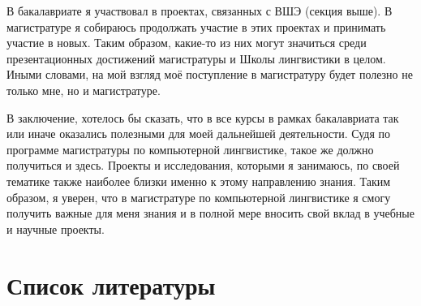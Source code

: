 \documentclass[a4paper,10pt]{article}
\begin{document}
В бакалавриате я участвовал в проектах, связанных с ВШЭ (секция выше). В магистратуре я собираюсь продолжать участие в этих проектах и принимать участие в новых. Таким образом, какие-то из них могут значиться среди презентационных достижений магистратуры и Школы лингвистики в целом. Иными словами, на мой взгляд моё поступление в магистратуру будет полезно не только мне, но и магистратуре.

В заключение, хотелось бы сказать, что в все курсы в рамках бакалавриата так или иначе оказались полезными для моей дальнейшей деятельности. Судя по программе магистратуры по компьютерной лингвистике, такое же должно получиться и здесь. Проекты и исследования, которыми я занимаюсь, по своей тематике также наиболее близки именно к этому направлению знания. Таким образом, я уверен, что в магистратуре по компьютерной лингвистике я смогу получить важные для меня знания и в полной мере вносить свой вклад в учебные и научные проекты.

\newpage

\section{Список литературы}
\printbibliography[heading=none]
\end{document}
